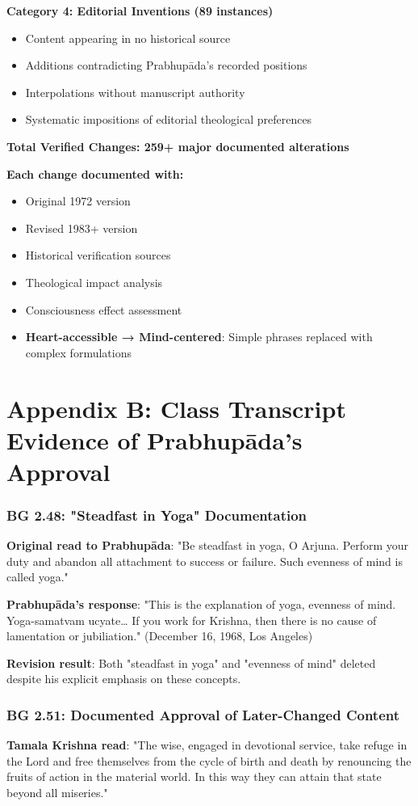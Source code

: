 \documentclass[11pt,twoside]{book}
\begin{document}
\textbf{\textbf{Category 4: Editorial Inventions (89 instances)}}
\begin{itemize}
\item Content appearing in no historical source
\item Additions contradicting Prabhupāda's recorded positions
\item Interpolations without manuscript authority
\item Systematic impositions of editorial theological preferences
\end{itemize}

\textbf{\textbf{Total Verified Changes: 259+ major documented alterations}}

\textbf{Each change documented with:}
\begin{itemize}
\item Original 1972 version
\item Revised 1983+ version
\item Historical verification sources
\item Theological impact analysis
\item Consciousness effect assessment
\item \textbf{\textbf{Heart-accessible → Mind-centered}}: Simple phrases replaced with complex formulations
\end{itemize}
\part*{Appendix B: Class Transcript Evidence of Prabhupāda's Approval}
\label{sec:org5e02397}
\thispagestyle{chapterpage}
\section*{BG 2.48: "Steadfast in Yoga" Documentation}
\label{sec:org4842614}
\textbf{\textbf{Original read to Prabhupāda}}: "Be steadfast in yoga, O Arjuna. Perform your duty and abandon all attachment to success or failure. Such evenness of mind is called yoga."

\textbf{\textbf{Prabhupāda's response}}: "This is the explanation of yoga, evenness of mind. Yoga-samatvam ucyate\ldots{} If you work for Krishna, then there is no cause of lamentation or jubiliation." (December 16, 1968, Los Angeles)

\textbf{\textbf{Revision result}}: Both "steadfast in yoga" and "evenness of mind" deleted despite his explicit emphasis on these concepts.
\section*{BG 2.51: Documented Approval of Later-Changed Content}
\label{sec:org8fe1bc7}
\textbf{\textbf{Tamala Krishna read}}: "The wise, engaged in devotional service, take refuge in the Lord and free themselves from the cycle of birth and death by renouncing the fruits of action in the material world. In this way they can attain that state beyond all miseries."
\end{document}
